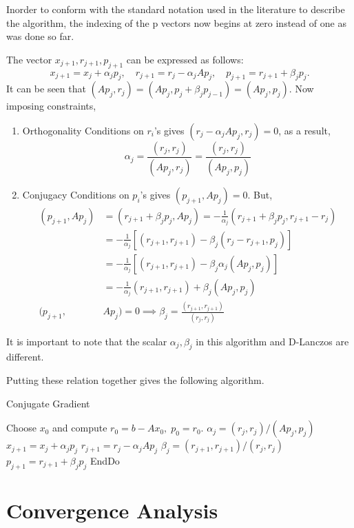 \documentclass[10pt,a4paper]{article}
\begin{document}
\begin{remark}
Inorder to conform with the standard notation used in the literature to describe the algorithm, the indexing of the p vectors now begins at zero instead of one as was done so far.
\end{remark}

The vector $x_{j+1},r_{j+1},p_{j+1}$ can be expressed as follows:
$$x_{j+1}=x_j+\alpha_jp_j,\quad r_{j+1}=r_j-\alpha_jAp_j,\quad p_{j+1}=r_{j+1}+\beta_jp_j.$$
It can be seen that $(Ap_j,r_j)=(Ap_j,p_j+\beta_jp_{j-1})=(Ap_j,p_j).$ Now imposing constraints,
\begin{enumerate}
\item Orthogonality Conditions on $r_i$'s gives $(r_j-\alpha_jAp_j,r_j)=0$, as a result,
$$\alpha_j = \frac{(r_j,r_j)}{(Ap_j,r_j)}=\frac{(r_j,r_j)}{(Ap_j,p_j)}$$
\item Conjugacy Conditions on $p_i$'s gives $(p_{j+1},Ap_j)=0$. But,
\begin{align*}
(p_{j+1},Ap_j) &= (r_{j+1}+\beta_jp_j,Ap_j) = -\frac{1}{\alpha_j}(r_{j+1}+\beta_jp_j,r_{j+1}-r_j)\\ 
&= -\frac{1}{\alpha_j}[(r_{j+1},r_{j+1})-\beta_j(r_j-r_{j+1},p_j)] \\
&= -\frac{1}{\alpha_j}[(r_{j+1},r_{j+1})-\beta_j\alpha_j(Ap_j,p_j)]  \\
&= -\frac{1}{\alpha_j}(r_{j+1},r_{j+1})+\beta_j(Ap_j,p_j)\\
(p_{j+1},&Ap_j) = 0 \implies \beta_j=\frac{(r_{j+1},r_{j+1})}{(r_j,r_j)}
\end{align*}
\end{enumerate}
It is important to note that the scalar $\alpha_j,\beta_j$ in this algorithm and D-Lanczos are different.

Putting these relation together gives the following algorithm.

\newpage

\begin{algorithm}
\caption{Conjugate Gradient}
\begin{algorithmic}[1]
\State Choose $x_0$ and compute $r_0=b-Ax_0,\;p_0=r_0.$
	\State $\alpha_j=(r_j,r_j)/(Ap_j,p_j)$
	\State $x_{j+1}=x_j+\alpha_jp_j$
	\State $r_{j+1}=r_j-\alpha_jAp_j$
	\State $\beta_j=(r_{j+1},r_{j+1})/(r_j,r_j)$
	\State $p_{j+1}=r_{j+1}+\beta_jp_j$
\EndFor
\State EndDo
\end{algorithmic}
\end{algorithm}

\section{Convergence Analysis}
\end{document}
